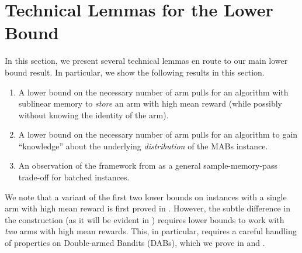 \section{Technical Lemmas for the Lower Bound}
\label{sec:tech-lemma}
In this section, we present several technical lemmas en route to our main lower bound result. In particular, we show the following results in this section.

\begin{enumerate}[label=\alph*).]
	\item A lower bound on the necessary number of arm pulls for an algorithm with sublinear memory to \emph{store} an arm with high mean reward (while possibly without knowing the identity of the arm).
	\item A lower bound on the necessary number of arm pulls for an algorithm to gain ``knowledge'' about the underlying \emph{distribution} of the MABs instance. 
	\item An observation of the framework from \cite{AW23BestArm} as a general sample-memory-pass trade-off for batched instances.
\end{enumerate}

We note that a variant of the first two lower bounds on instances with a single arm with high mean reward is first proved in \cite{AW23BestArm}. However, the subtle difference in the construction (as it will be evident in ) requires lower bounds to work with \emph{two} arms with high mean rewards. This, in particular, requires a careful handling of properties on Double-armed Bandits (DABs), which we prove in  and .

